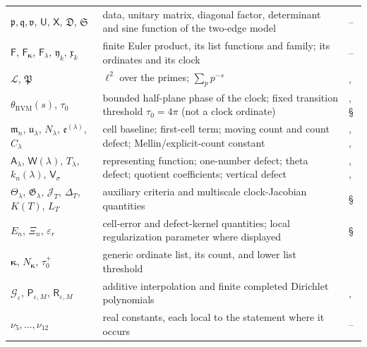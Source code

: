 \documentclass[11pt,reqno]{amsart}
\makeatletter
\let\CG@origref\ref
\let\CG@origeqref\eqref
\newcommand{\CG@gettip}[1]{\@ifundefined{CGTip@#1}{Reference: #1}{\csname CGTip@#1\endcsname}}
\DeclareRobustCommand{\CGref}[1]{\pdftooltip{\CG@origref{#1}}{\CG@gettip{#1}}}
\DeclareRobustCommand{\CGeqref}[1]{\pdftooltip{\CG@origeqref{#1}}{\CG@gettip{#1}}}
\numberwithin{equation}{section}
\theoremstyle{plain}
\theoremstyle{definition}
\theoremstyle{remark}
\newcommand{\RVM}{\mathrm{RVM}}
\makeatother
\begin{document}
{\begin{longtable}{>{\raggedright\arraybackslash}p{}>{\raggedright\arraybackslash}p{}>{\raggedright\arraybackslash}p{}}
$\mathfrak p,\mathfrak q,\mathfrak v$, $\mathsf U$, $\mathsf X$, $\mathfrak D$, $\mathfrak S$ & data, unitary matrix, diagonal factor, determinant and sine function of the two-edge model & \CGeqref{eq:graph-matrices}--\CGeqref{eq:graph-sine}\\
$\mathsf F$, $\mathsf F_{\boldsymbol{\kappa}}$, $\mathsf F_\lambda$, $\mathfrak y_k$, $\mathfrak x_k$ & finite Euler product, its list functions and family; its ordinates and its clock & \CGeqref{eq:finite-euler}--\CGeqref{eq:finite-euler-list}\\
$\mathscr L$, $\mathfrak P$ & $\ell^2$ over the primes; $\sum_pp^{-s}$ & \CGeqref{eq:prime-det}, \CGeqref{eq:prime-det2}\\
$\theta_{\RVM}(s)$, $\tau_0$ & bounded half-plane phase of the clock; fixed transition threshold $\tau_0=4\pi$ (not a clock ordinate) & \CGeqref{eq:halfplane-RVM}, \S\CGref{subsec:transition-proof}\\
$\mathfrak m_n$, $\mathfrak u_\lambda$, $N_\lambda$, $\mathfrak e^{(\lambda)}$, $C_\lambda$ & cell baseline; first-cell term; moving count and count defect; Mellin/explicit-count constant & \CGeqref{eq:cell-mass-W}, \CGeqref{eq:joining-factor}, \CGeqref{eq:family-count-primitive}\\
$\mathsf A_\lambda$, $\mathsf W(\lambda)$, $T_\lambda$, $k_n(\lambda)$, $\mathsf V_\sigma$ & representing function; one-number defect; theta defect; quotient coefficients; vertical defect & \CGeqref{eq:one-number}, \CGeqref{eq:theta-defect}, \CGeqref{eq:vertical-defect}\\
$\Theta_\lambda$, $\mathfrak G_\lambda$, $\mathcal J_T$, $\Delta_T$, $K(T)$, $L_T$ & auxiliary criteria and multiscale clock-Jacobian quantities & \S\CGref{sec:criteria}\\
$E_n$, $\Xi_n$, $\varepsilon_r$ & cell-error and defect-kernel quantities; local regularization parameter where displayed & \S\CGref{sec:criteria}\\
$\boldsymbol{\kappa}$, $N_{\boldsymbol{\kappa}}$, $\tau_0^+$ & generic ordinate list, its count, and lower list threshold & \CGeqref{eq:list-space}\\
$\mathcal G_\varepsilon$, $\mathsf P_{\varepsilon,M}$, $\mathsf R_{\varepsilon,M}$ & additive interpolation and finite completed Dirichlet polynomials & \CGeqref{eq:additive-family-v18}, \CGeqref{eq:finite-additive-v18}\\
$\nu_5,\dots,\nu_{12}$ & real constants, each local to the statement where it occurs & --\\
\midrule

\end{longtable}}
\end{document}
